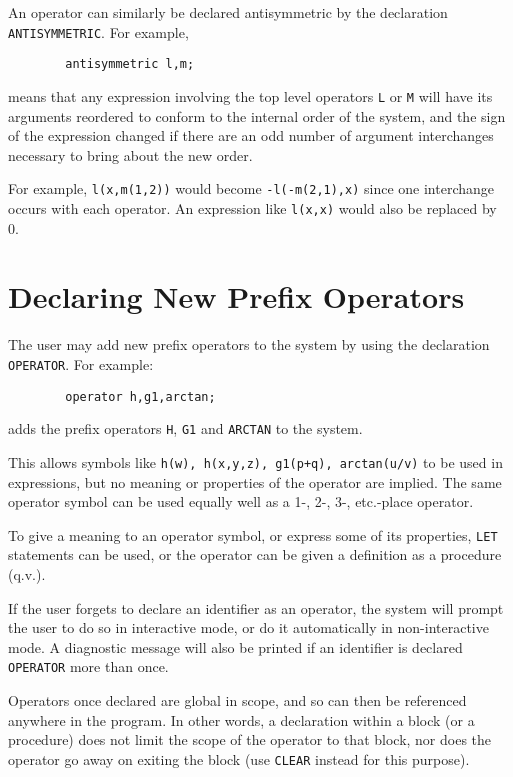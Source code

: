 An operator can similarly be declared antisymmetric by the declaration
{\tt ANTISYMMETRIC}.  For example,
\begin{verbatim}
        antisymmetric l,m;
\end{verbatim}
means that any expression involving the top level operators {\tt L} or
{\tt M} will have its arguments reordered to conform to the internal order
of the system, and the sign of the expression changed if there are an odd
number of argument interchanges necessary to bring about the new order.

For example, {\tt l(x,m(1,2))} would become {\tt -l(-m(2,1),x)} since one
interchange occurs with each operator.  An expression like {\tt l(x,x)}
would also be replaced by 0.

\section{Declaring New Prefix Operators}

The user may add new prefix operators to the system by
using the declaration {\tt OPERATOR}. For example:
\begin{verbatim}
        operator h,g1,arctan;
\end{verbatim}
adds the prefix operators {\tt H}, {\tt G1} and {\tt ARCTAN} to the system.

This allows symbols like {\tt h(w), h(x,y,z), g1(p+q), arctan(u/v)} to be
used in expressions, but no meaning or properties of the operator are
implied.  The same operator symbol can be used equally well as a 1-, 2-,
3-, etc.-place operator.

To give a meaning to an operator symbol, or express some of its
properties, {\tt LET}  statements can be used, or the operator
can be given a definition as a procedure (q.v.).

If the user forgets to declare an identifier as an operator, the system
will prompt the user to do so in interactive mode, or do it automatically
in non-interactive mode. A diagnostic message will also be printed if an
identifier is declared {\tt OPERATOR} more than once.

Operators once declared are global in scope, and so can then be referenced
anywhere in the program.  In other words, a declaration within a block (or
a procedure) does not limit the scope of the operator to that block, nor
does the operator go away on exiting the block (use {\tt CLEAR} instead
for this purpose).


